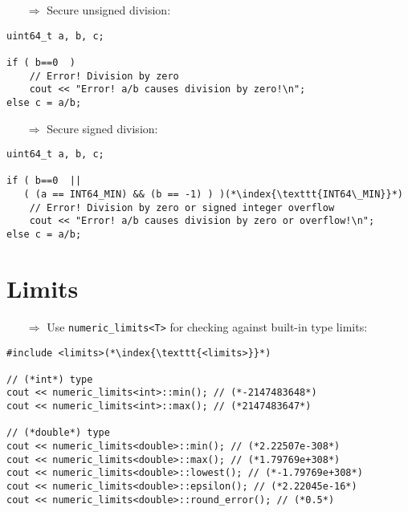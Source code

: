 \documentclass[10pt]{book}
\begin{document}
\begin{enumerate}
\item[$\Rightarrow$] Secure unsigned division:
\end{enumerate}
\begin{lstlisting}
uint64_t a, b, c;

if ( b==0  )
    // Error! Division by zero
    cout << "Error! a/b causes division by zero!\n";
else c = a/b;
\end{lstlisting}
\begin{enumerate}
\item[$\Rightarrow$] Secure signed division:
\end{enumerate}
\begin{lstlisting}
uint64_t a, b, c;

if ( b==0  || 
   ( (a == INT64_MIN) && (b == -1) ) )(*\index{\texttt{INT64\_MIN}}*)
    // Error! Division by zero or signed integer overflow
    cout << "Error! a/b causes division by zero or overflow!\n";
else c = a/b;
\end{lstlisting}
%
%
\section{Limits}
\small
\begin{enumerate}
\item[$\Rightarrow$] Use \texttt{numeric\_limits<T>} for checking against built-in type limits:
\end{enumerate}
\begin{lstlisting}
#include <limits>(*\index{\texttt{<limits>}}*)

// (*int*) type
cout << numeric_limits<int>::min(); // (*-2147483648*)
cout << numeric_limits<int>::max(); // (*2147483647*)
    
// (*double*) type
cout << numeric_limits<double>::min(); // (*2.22507e-308*)
cout << numeric_limits<double>::max(); // (*1.79769e+308*)
cout << numeric_limits<double>::lowest(); // (*-1.79769e+308*)
cout << numeric_limits<double>::epsilon(); // (*2.22045e-16*)
cout << numeric_limits<double>::round_error(); // (*0.5*)
\end{lstlisting}
%
%
\end{document}
